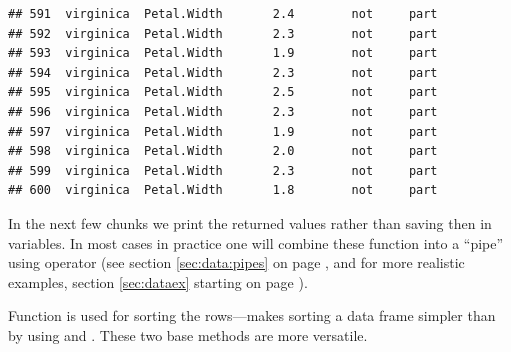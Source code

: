\documentclass[krantz2]{krantz}\usepackage{knitr}%
\begin{document}
\begin{knitrout}
\begin{kframe}
\begin{verbatim}
## 591  virginica  Petal.Width       2.4        not     part
## 592  virginica  Petal.Width       2.3        not     part
## 593  virginica  Petal.Width       1.9        not     part
## 594  virginica  Petal.Width       2.3        not     part
## 595  virginica  Petal.Width       2.5        not     part
## 596  virginica  Petal.Width       2.3        not     part
## 597  virginica  Petal.Width       1.9        not     part
## 598  virginica  Petal.Width       2.0        not     part
## 599  virginica  Petal.Width       2.3        not     part
## 600  virginica  Petal.Width       1.8        not     part
\end{verbatim}
\end{kframe}
\end{knitrout}

In the next few chunks we print the returned values rather than saving then in variables. In most cases in practice one will combine these function into a ``pipe'' using operator \Roperator{\%>\%} (see section \ref{sec:data:pipes} on page \pageref{sec:data:pipes}, and for more realistic examples, section \ref{sec:dataex} starting on page \pageref{sec:dataex}).

Function  is used for sorting the rows---makes sorting a data frame simpler than by using  and . These two base \Rlang methods are more versatile.
\end{document}
